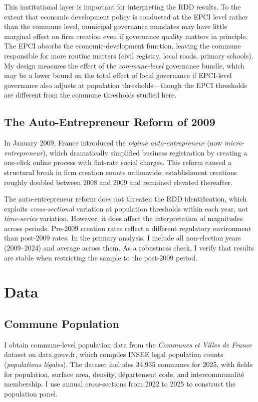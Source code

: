 \documentclass[12pt]{article}
\begin{document}
This institutional layer is important for interpreting the RDD results. To the extent that economic development policy is conducted at the EPCI level rather than the commune level, municipal governance mandates may have little marginal effect on firm creation even if governance quality matters in principle. The EPCI absorbs the economic-development function, leaving the commune responsible for more routine matters (civil registry, local roads, primary schools). My design measures the effect of the \textit{commune-level} governance bundle, which may be a lower bound on the total effect of local governance if EPCI-level governance also adjusts at population thresholds---though the EPCI thresholds are different from the commune thresholds studied here.

\subsection{The Auto-Entrepreneur Reform of 2009}

In January 2009, France introduced the \textit{r\'{e}gime auto-entrepreneur} (now \textit{micro-entrepreneur}), which dramatically simplified business registration by creating a one-click online process with flat-rate social charges. This reform caused a structural break in firm creation counts nationwide: establishment creations roughly doubled between 2008 and 2009 and remained elevated thereafter.

The auto-entrepreneur reform does not threaten the RDD identification, which exploits \textit{cross-sectional} variation at population thresholds within each year, not \textit{time-series} variation. However, it does affect the interpretation of magnitudes across periods. Pre-2009 creation rates reflect a different regulatory environment than post-2009 rates. In the primary analysis, I include all non-election years (2009--2024) and average across them. As a robustness check, I verify that results are stable when restricting the sample to the post-2009 period.

\section{Data}

\subsection{Commune Population}

I obtain commune-level population data from the \textit{Communes et Villes de France} dataset on data.gouv.fr, which compiles INSEE legal population counts (\textit{populations l\'{e}gales}). The dataset includes 34,935 communes for 2025, with fields for population, surface area, density, d\'{e}partement code, and intercommunalit\'{e} membership. I use annual cross-sections from 2022 to 2025 to construct the population panel.
\end{document}
